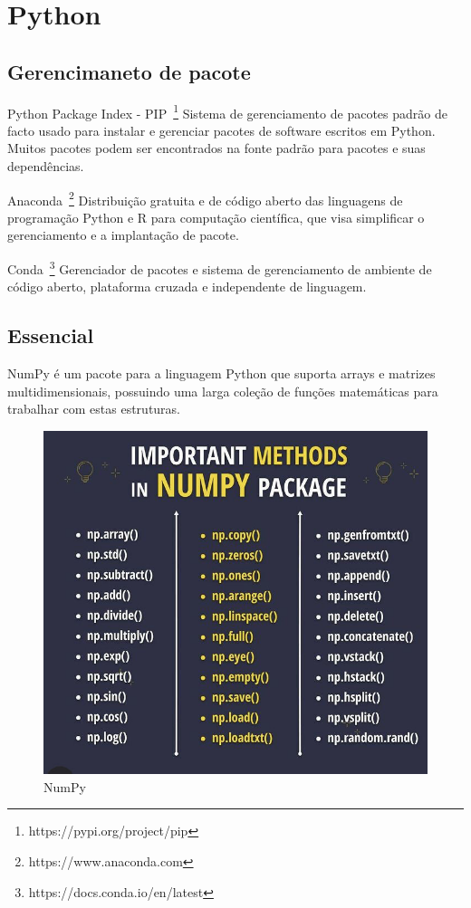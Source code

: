 \newpage
\section{Python}

\subsection{Gerencimaneto de pacote}

Python Package Index - PIP~\footnote{https://pypi.org/project/pip}
Sistema de gerenciamento de pacotes padrão de facto usado para instalar e gerenciar pacotes de software escritos em Python. 
Muitos pacotes podem ser encontrados na fonte padrão para pacotes e suas dependências.

Anaconda~\footnote{https://www.anaconda.com} 
Distribuição gratuita e de código aberto das linguagens de programação Python e R para computação científica, que visa simplificar o gerenciamento e a implantação de pacote.

Conda~\footnote{https://docs.conda.io/en/latest}
Gerenciador de pacotes e sistema de gerenciamento de ambiente de código aberto, plataforma cruzada e independente de linguagem.


\subsection{Essencial}

NumPy é um pacote para a linguagem Python que suporta arrays e matrizes multidimensionais, possuindo uma larga coleção de funções matemáticas para trabalhar com estas estruturas.

\begin{figure}[!htp]
    \centering
    \includegraphics[scale=.9]{../img/python/numpy.jpeg}
    \caption{NumPy}
    \label{img:numpy}
\end{figure}

